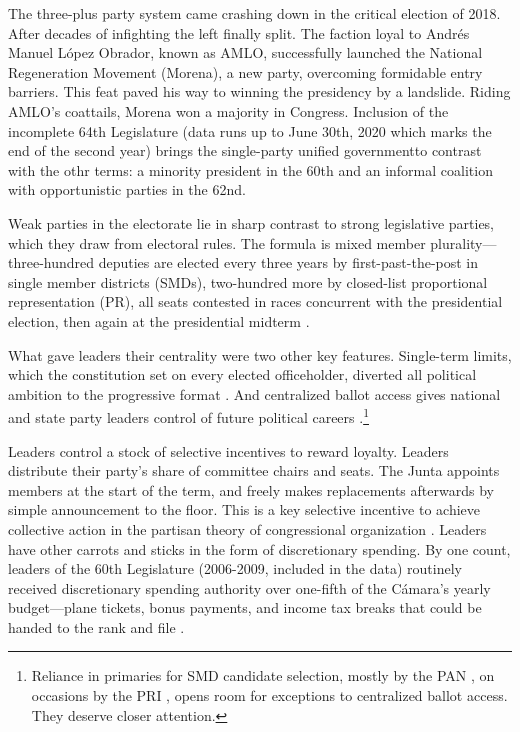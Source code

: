 \documentclass[letter,12pt]{article}
\begin{document}
The three-plus party system came crashing down in the critical election of 2018. After decades of infighting the left finally split. The faction loyal to Andrés Manuel López Obrador, known as AMLO, successfully launched the National Regeneration Movement (Morena), a new party, overcoming formidable entry barriers. This feat paved his way to winning the presidency by a landslide. Riding AMLO's coattails, Morena won a majority in Congress. Inclusion of the incomplete 64th Legislature (data runs up to June 30th, 2020 which marks the end of the second year) brings the single-party unified governmentto contrast with the othr terms: a minority president in the 60th and an informal coalition with opportunistic parties in the 62nd.


Weak parties in the electorate lie in sharp contrast to strong legislative parties, which they draw from electoral rules. The formula is mixed member plurality---three-hundred deputies are elected every three years by first-past-the-post in single member districts (SMDs), two-hundred more by closed-list proportional representation (PR), all seats contested in races concurrent with the presidential election, then again at the presidential midterm \citep{weldonMixedMemberSys2001}.

What gave leaders their centrality were two other key features. Single-term limits, which the constitution set on every elected officeholder, diverted all political ambition to the progressive format \citep{schlesinger.1966}. And centralized ballot access gives national and state party leaders control of future political careers \citep{langston.2008}.\footnote{Reliance in primaries for SMD candidate selection, mostly by the PAN \citep{ascencio.kerevel.cand-sel-beh.2021}, on occasions by the PRI \citep{poire.phd.2002}, opens room for exceptions to centralized ballot access. They deserve closer attention.}

Leaders control a stock of selective incentives to reward loyalty. Leaders distribute their party's share of committee chairs and seats. The Junta appoints members at the start of the term, and freely makes replacements afterwards by simple announcement to the floor. This is a key selective incentive to achieve collective action in the partisan theory of congressional organization \citep{cox.mccubbins.1993}. Leaders have other carrots and sticks in the form of discretionary spending. By one count, leaders of the 60th Legislature (2006-2009, included in the data) routinely received discretionary spending authority over one-fifth of the Cámara's yearly budget---plane tickets, bonus payments, and income tax breaks that could be handed to the rank and file \citep{casar.2011}.
\end{document}
